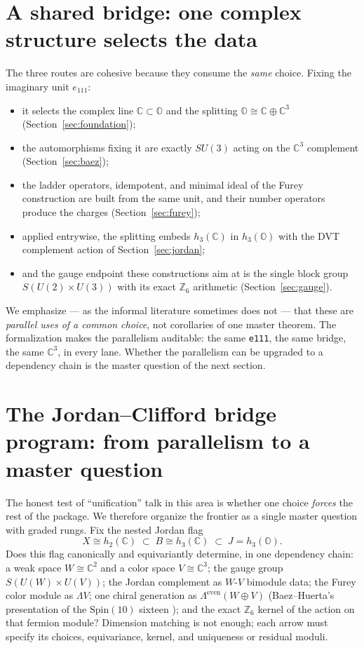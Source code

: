 \documentclass[11pt]{article}
\newcommand{\C}{\mathbb{C}}
\newcommand{\OO}{\mathbb{O}}
\newcommand{\leanname}[1]{\texttt{#1}}
\begin{document}
\section{A shared bridge: one complex structure selects the data}
\label{sec:bridge}

The three routes are cohesive because they consume the \emph{same}
choice.  Fixing the imaginary unit $e_{111}$:

\begin{itemize}[leftmargin=2em]
\item it selects the complex line $\C\subset\OO$ and the splitting
  $\OO \cong \C\oplus\C^3$ (Section~\ref{sec:foundation});
\item the automorphisms fixing it are exactly $SU(3)$ acting on the
  $\C^3$ complement (Section~\ref{sec:baez});
\item the ladder operators, idempotent, and minimal ideal of the Furey
  construction are built from the same unit, and their number operators
  produce the charges (Section~\ref{sec:furey});
\item applied entrywise, the splitting embeds $h_3(\C)$ in $h_3(\OO)$
  with the DVT complement action of Section~\ref{sec:jordan};
\item and the gauge endpoint these constructions aim at is the single
  block group $S(U(2)\times U(3))$ with its exact $\mathbb{Z}_6$
  arithmetic (Section~\ref{sec:gauge}).
\end{itemize}

We emphasize --- as the informal literature sometimes does not --- that
these are \emph{parallel uses of a common choice}, not corollaries of one
master theorem.  The formalization makes the parallelism auditable: the
same \leanname{e111}, the same bridge, the same $\C^3$, in every lane.
Whether the parallelism can be upgraded to a dependency chain is the
master question of the next section.

\section{The Jordan--Clifford bridge program: from parallelism to a
master question}
\label{sec:jcbridge}

The honest test of ``unification'' talk in this area is whether one
choice \emph{forces} the rest of the package.  We therefore organize the
frontier as a single master question with graded rungs.  Fix the nested
Jordan flag
\[
X \cong h_2(\C) \;\subset\; B \cong h_3(\C) \;\subset\; J = h_3(\OO).
\]
Does this flag canonically and equivariantly determine, in one dependency
chain: a weak space $W\cong\C^2$ and a color space $V\cong\C^3$; the
gauge group $S(U(W)\times U(V))$; the Jordan complement as
$W$-$V$ bimodule data; the Furey color module as $\Lambda V$; one chiral
generation as $\Lambda^{\mathrm{even}}(W\oplus V)$ (Baez--Huerta's
presentation of the $\mathrm{Spin}(10)$ sixteen \cite{BaezHuerta2009});
and the exact $\mathbb{Z}_6$ kernel of the action on that fermion
module?  Dimension matching is not enough; each arrow must specify its
choices, equivariance, kernel, and uniqueness or residual moduli.
\end{document}
